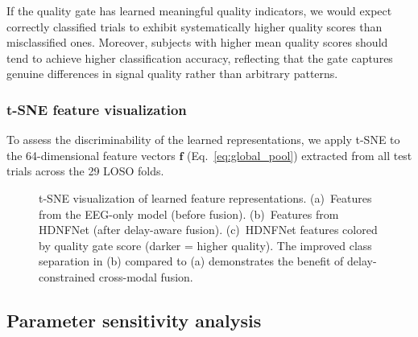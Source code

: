 \documentclass[preprint,12pt,authoryear]{elsarticle}
\begin{document}

If the quality gate has learned meaningful quality indicators, we would expect correctly classified trials to exhibit systematically higher quality scores than misclassified ones. Moreover, subjects with higher mean quality scores should tend to achieve higher classification accuracy, reflecting that the gate captures genuine differences in signal quality rather than arbitrary patterns.


\subsubsection{t-SNE feature visualization}
\label{sec:vis_tsne}

To assess the discriminability of the learned representations, we apply t-SNE \citep{maaten2008tsne} to the 64-dimensional feature vectors $\mathbf{f}$ (Eq.~\ref{eq:global_pool}) extracted from all test trials across the 29 LOSO folds.

\begin{figure}[t]
\centering
\caption{t-SNE visualization of learned feature representations. (a)~Features from the EEG-only model (before fusion). (b)~Features from HDNFNet (after delay-aware fusion). (c)~HDNFNet features colored by quality gate score (darker = higher quality). The improved class separation in (b) compared to (a) demonstrates the benefit of delay-constrained cross-modal fusion.}
\label{fig:tsne}
\end{figure}


\subsection{Parameter sensitivity analysis}
\label{sec:sensitivity}
\end{document}
